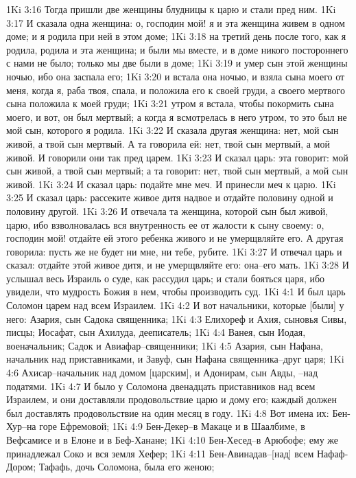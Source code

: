 1Ki 3:16  Тогда пришли две женщины блудницы к царю и стали пред ним.
1Ki 3:17  И сказала одна женщина: о, господин мой! я и эта женщина живем в одном доме; и я родила при ней в этом доме;
1Ki 3:18  на третий день после того, как я родила, родила и эта женщина; и были мы вместе, и в доме никого постороннего с нами не было; только мы две были в доме;
1Ki 3:19  и умер сын этой женщины ночью, ибо она заспала его;
1Ki 3:20  и встала она ночью, и взяла сына моего от меня, когда я, раба твоя, спала, и положила его к своей груди, а своего мертвого сына положила к моей груди;
1Ki 3:21  утром я встала, чтобы покормить сына моего, и вот, он был мертвый; а когда я всмотрелась в него утром, то это был не мой сын, которого я родила.
1Ki 3:22  И сказала другая женщина: нет, мой сын живой, а твой сын мертвый. А та говорила ей: нет, твой сын мертвый, а мой живой. И говорили они так пред царем.
1Ki 3:23  И сказал царь: эта говорит: мой сын живой, а твой сын мертвый; а та говорит: нет, твой сын мертвый, а мой сын живой.
1Ki 3:24  И сказал царь: подайте мне меч. И принесли меч к царю.
1Ki 3:25  И сказал царь: рассеките живое дитя надвое и отдайте половину одной и половину другой.
1Ki 3:26  И отвечала та женщина, которой сын был живой, царю, ибо взволновалась вся внутренность ее от жалости к сыну своему: о, господин мой! отдайте ей этого ребенка живого и не умерщвляйте его. А другая говорила: пусть же не будет ни мне, ни тебе, рубите.
1Ki 3:27  И отвечал царь и сказал: отдайте этой живое дитя, и не умерщвляйте его: она--его мать.
1Ki 3:28  И услышал весь Израиль о суде, как рассудил царь; и стали бояться царя, ибо увидели, что мудрость Божия в нем, чтобы производить суд.
1Ki 4:1  И был царь Соломон царем над всем Израилем.
1Ki 4:2  И вот начальники, которые [были] у него: Азария, сын Садока священника;
1Ki 4:3  Елихореф и Ахия, сыновья Сивы, писцы; Иосафат, сын Ахилуда, дееписатель;
1Ki 4:4  Ванея, сын Иодая, военачальник; Садок и Авиафар--священники;
1Ki 4:5  Азария, сын Нафана, начальник над приставниками, и Завуф, сын Нафана священника--друг царя;
1Ki 4:6  Ахисар--начальник над домом [царским], и Адонирам, сын Авды, --над податями.
1Ki 4:7  И было у Соломона двенадцать приставников над всем Израилем, и они доставляли продовольствие царю и дому его; каждый должен был доставлять продовольствие на один месяц в году.
1Ki 4:8  Вот имена их: Бен-Хур--на горе Ефремовой;
1Ki 4:9  Бен-Декер--в Макаце и в Шаалбиме, в Вефсамисе и в Елоне и в Беф-Ханане;
1Ki 4:10  Бен-Хесед--в Арюбофе; ему же принадлежал Соко и вся земля Хефер;
1Ki 4:11  Бен-Авинадав--[над] всем Нафаф-Дором; Тафафь, дочь Соломона, была его женою;
